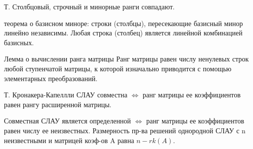 \documentclass{article}
\begin{document}
Т. Столбцовый, строчный и минорные ранги совпадают.

\textsf{теорема о базисном миноре:} строки (столбцы), пересекающие базисный минор линейно независимы. Любая строка (столбец) является линейной комбинацией базисных.

\textsf{Лемма о вычислении ранга матрицы}
Ранг матрицы равен числу ненулевых строк любой ступенчатой матрицы, к которой изначально приводится с помощью элементарных преобразований.

\textsf{Т. Кронакера-Капеллли} СЛАУ совместна $\Leftrightarrow$ ранг матрицы ее коэффициентов равен рангу расширенной матрицы.

Совместная СЛАУ является определенной $\Leftrightarrow$ ранг матрицы ее коэффициентов равен числу ее неизвестных. Размерность пр-ва решений однородной СЛАУ с n неизвестными и матрицей коэф-ов A равна $n-rk(A)$.
\end{document}
